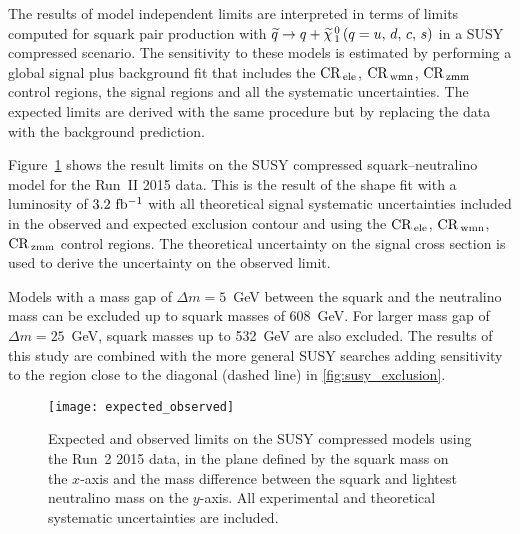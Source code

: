 The results of model independent limits are interpreted in terms of limits
computed for squark pair production with $\widetilde{q} \rightarrow q + \widetilde{\chi}_{\, 1}^{\, 0}\, (q = u,\, d,\, c,\, s)$ in a SUSY compressed
scenario. The sensitivity to these models is estimated by performing a global
signal plus background fit that includes the $\mathrm{CR}_\mathrm{\, ele}$, $\mathrm{CR}_\mathrm{\, wmn}$, $\mathrm{CR}_\mathrm{\, zmm}$
control regions, the signal regions and all the systematic uncertainties. The
expected limits are derived with the same procedure but by replacing the data
with the background prediction.

Figure~\ref{fig:expected_observed} shows the result limits on the SUSY
compressed squark--neutralino model for the Run~II 2015 data. This is the result
of the shape fit with a luminosity of $3.2~\mbox{fb$^{-1}$}$ with all theoretical signal
systematic uncertainties included in the observed and expected exclusion contour
and using the $\mathrm{CR}_\mathrm{\, ele}$, $\mathrm{CR}_\mathrm{\, wmn}$, $\mathrm{CR}_\mathrm{\, zmm}$ control regions. The theoretical
uncertainty on the signal cross section is used to derive the uncertainty on the
observed limit.

Models with a mass gap of $\Delta m = 5$~GeV between the squark and the
neutralino mass can be excluded up to squark masses of 608~GeV. For larger mass
gap of $\Delta m = 25$~GeV, squark masses up to 532~GeV are also excluded. The
results of this study are combined with the more general SUSY searches adding
sensitivity to the region close to the diagonal (dashed line) in
\cref{fig:susy_exclusion}.


\begin{figure}[!h]
  \centering
    \texttt{[image: expected\_observed]}
    \caption{Expected and observed limits on the SUSY compressed models using
      the Run~2 2015 data, in the plane defined by the squark mass on the
      $x$-axis and the mass difference between the squark and lightest
      neutralino mass on the $y$-axis. All experimental and theoretical
      systematic uncertainties are included.}
\label{fig:results:susy:compressed_observed}
    \label{fig:expected_observed}
\end{figure}
